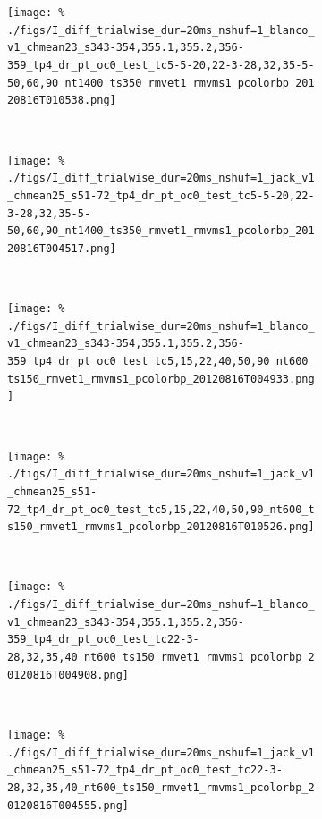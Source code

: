 \begin{figure}[htbp]
    \begin{subfigure}[b]{0.5\linewidth}
        \centering
        \caption{}
        \label{fig:b1-alldif}
        \texttt{[image: \%
./figs/I\_diff\_trialwise\_dur=20ms\_nshuf=1\_blanco\_v1\_chmean23\_s343-354,355.1,355.2,356-359\_tp4\_dr\_pt\_oc0\_test\_tc5-5-20,22-3-28,32,35-5-50,60,90\_nt1400\_ts350\_rmvet1\_rmvms1\_pcolorbp\_20120816T010538.png]}
    \end{subfigure}
    ~~
    \begin{subfigure}[b]{0.5\linewidth}
        \centering
        \caption{}
        \label{fig:j1-alldif}
        \texttt{[image: \%
./figs/I\_diff\_trialwise\_dur=20ms\_nshuf=1\_jack\_v1\_chmean25\_s51-72\_tp4\_dr\_pt\_oc0\_test\_tc5-5-20,22-3-28,32,35-5-50,60,90\_nt1400\_ts350\_rmvet1\_rmvms1\_pcolorbp\_20120816T004517.png]}
    \end{subfigure}
    \\
    \begin{subfigure}[b]{0.5\linewidth}
        \centering
        \caption{}
        \label{fig:b1-cdif}
        \texttt{[image: \%
./figs/I\_diff\_trialwise\_dur=20ms\_nshuf=1\_blanco\_v1\_chmean23\_s343-354,355.1,355.2,356-359\_tp4\_dr\_pt\_oc0\_test\_tc5,15,22,40,50,90\_nt600\_ts150\_rmvet1\_rmvms1\_pcolorbp\_20120816T004933.png]}
    \end{subfigure}
    ~~
    \begin{subfigure}[b]{0.5\linewidth}
        \centering
        \caption{}
        \label{fig:j1-cdif}
        \texttt{[image: \%
./figs/I\_diff\_trialwise\_dur=20ms\_nshuf=1\_jack\_v1\_chmean25\_s51-72\_tp4\_dr\_pt\_oc0\_test\_tc5,15,22,40,50,90\_nt600\_ts150\_rmvet1\_rmvms1\_pcolorbp\_20120816T010526.png]}
    \end{subfigure}
    \\
    \begin{subfigure}[b]{0.5\linewidth}
        \centering
        \caption{}
        \label{fig:b1-fdif}
        \texttt{[image: \%
./figs/I\_diff\_trialwise\_dur=20ms\_nshuf=1\_blanco\_v1\_chmean23\_s343-354,355.1,355.2,356-359\_tp4\_dr\_pt\_oc0\_test\_tc22-3-28,32,35,40\_nt600\_ts150\_rmvet1\_rmvms1\_pcolorbp\_20120816T004908.png]}
    \end{subfigure}
    ~~
    \begin{subfigure}[b]{0.5\linewidth}
        \centering
        \caption{}
        \label{fig:j1-fdif}
        \texttt{[image: \%
./figs/I\_diff\_trialwise\_dur=20ms\_nshuf=1\_jack\_v1\_chmean25\_s51-72\_tp4\_dr\_pt\_oc0\_test\_tc22-3-28,32,35,40\_nt600\_ts150\_rmvet1\_rmvms1\_pcolorbp\_20120816T004555.png]}

\end{subfigure}
\end{figure}

